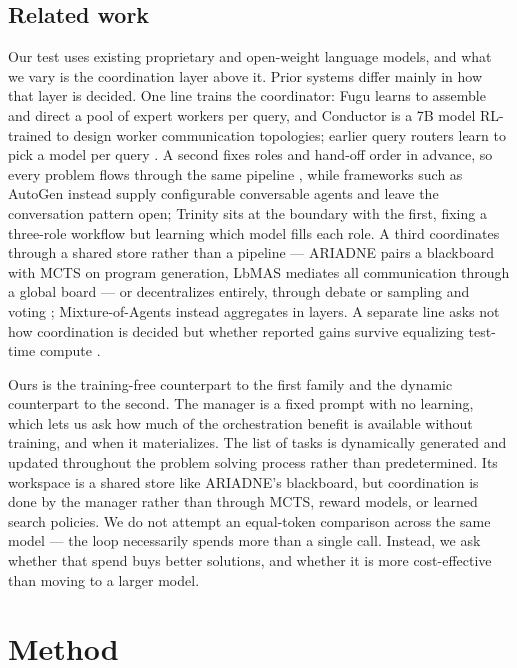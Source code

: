 \documentclass{article}
\begin{document}
\subsection{Related work}
\label{sec:related}

Our test uses existing proprietary and open-weight language models, and what
we vary is the coordination layer above it. Prior systems differ mainly in how that layer is
decided. One line trains the coordinator: Fugu \citep{sakana2026} learns to assemble
and direct a pool of expert workers per query, and Conductor \citep{nielsen2025} is a 7B
model RL-trained to design worker communication topologies; earlier query routers learn to
pick a model per query \citep{ong2024}. A second fixes roles and hand-off order in advance,
so every problem flows through the same pipeline
\citep{hong2023,qian2023,li2023,huang2023,islam2024}, while frameworks such as AutoGen
\citep{wu2023} instead supply configurable conversable agents and leave the conversation
pattern open; Trinity \citep{xu2025} sits at the boundary with the first, fixing a
three-role workflow but learning which model fills each role. A third coordinates through a
shared store rather than a pipeline --- ARIADNE \citep{wei2026} pairs a blackboard with MCTS
on program generation, LbMAS \citep{han2025} mediates all communication through a global
board --- or decentralizes entirely, through debate \citep{du2023} or sampling and voting
\citep{li2024}; Mixture-of-Agents \citep{wangj2024a} instead aggregates in layers. A
separate line asks not how coordination is decided but whether reported gains survive
equalizing test-time compute \citep{wangj2024b,tran2026}.

Ours is the training-free counterpart to the first family and the dynamic counterpart to the
second. The manager is a fixed prompt with no learning, which lets us ask how much of the
orchestration benefit is available without training, and when it materializes. The list of tasks is dynamically generated and updated throughout the problem solving process rather than predetermined.
Its workspace is a shared store like ARIADNE's blackboard, but coordination is done by the manager
rather than through MCTS, reward models, or learned search policies. We do not attempt
an equal-token comparison across the same model --- the loop necessarily spends more than a single call. 
Instead, we ask whether that spend buys better solutions, and whether it is more cost-effective than moving to a larger model.

\section{Method}
\label{sec:method}
\end{document}
